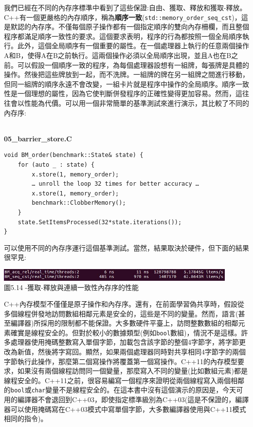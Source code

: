我們已經在不同的內存序標準中看到了這些保證:自由、獲取、釋放和獲取-釋放。C++有一個更嚴格的內存順序，稱為\textbf{順序一致}(\texttt{std::memory\_order\_seq\_cst})，這是默認的內存序。不僅每個原子操作都有一個指定順序的雙向內存柵欄，而且整個程序都滿足順序一致性的要求。這個要求表明，程序的行為都按照一個全局順序執行。此外，這個全局順序有一個重要的屬性。在一個處理器上執行的任意兩個操作A和B，使得A在B之前執行。這兩個操作必須以全局順序出現，並且A也在B之前。可以假設一個順序一致的程序，為每個處理器設想有一組牌，每張牌是具體的操作。然後把這些牌放到一起，而不洗牌。一組牌的牌在另一組牌之間進行移動，但同一組牌的順序永遠不會改變，一組卡片就是程序中操作的全局順序。順序一致性是一個理想的屬性，因為它使判斷併發程序的正確性變得更加容易。然而，這往往會以性能為代價。可以用一個非常簡單的基準測試來進行演示，其比較了不同的內存序:

\hspace*{\fill} \\ %
\noindent
\textbf{05\_barrier\_store.C}
\begin{lstlisting}[style=styleCXX]
void BM_order(benchmark::State& state) {
	for (auto _ : state) {
		x.store(1, memory_order);
		… unroll the loop 32 times for better accuracy …
		x.store(1, memory_order);
		benchmark::ClobberMemory();
	}
	state.SetItemsProcessed(32*state.iterations());
}
\end{lstlisting}

可以使用不同的內存序運行這個基準測試。當然，結果取決於硬件，但下面的結果很罕見:

\begin{center}
\includegraphics[width=0.9\textwidth]{content/1/chapter5/images/14.jpg}\\
圖5.14 -獲取-釋放與連續一致性內存序的性能
\end{center}

C++內存模型不僅僅是原子操作和內存序。還有，在前面學習偽共享時，假設從多個線程併發地訪問數組相鄰元素是安全的，這些是不同的變量。然而，語言(甚至編譯器)所採用的限制都不能保證。大多數硬件平臺上，訪問整數數組的相鄰元素確實是線程安全的。但對於較小的數據類型(例如\texttt{bool}數組)，情況不是這樣。許多處理器使用掩碼整數寫入單個字節，加載包含該字節的整個4字節字，將字節更改為新值，然後將字寫回。顯然，如果兩個處理器同時對共享相同4字節字的兩個字節執行此操作，那麼第二個寫操作將覆蓋第一個寫操作。C++11的內存模型要求，如果沒有兩個線程訪問同一個變量，那麼寫入不同的變量(比如數組元素)都是線程安全的。C++11之前，很容易編寫一個程序來證明從兩個線程寫入兩個相鄰的\texttt{bool}或\texttt{char}變量不是線程安全的。在這本書中沒有這個演示的原因是，今天可用的編譯器不會退回到C++03，即使指定標準級別為C++03(這是不保證的，編譯器可以使用掩碼寫在C++03模式中寫單個字節，大多數編譯器使用與C++11模式相同的指令)。

